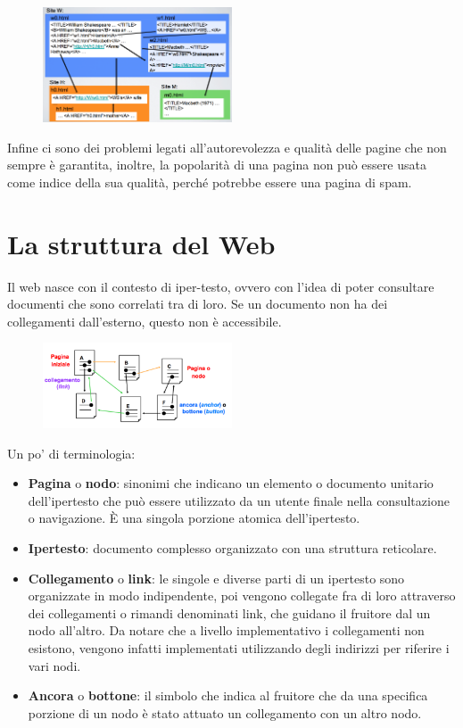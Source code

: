 \begin{figure}[htbp]
	\centering
	\includegraphics[width=0.5\textwidth]{images/l17-fig-1.png}
\end{figure}

Infine ci sono dei problemi legati all'autorevolezza e qualità delle pagine che non sempre è garantita, inoltre, la popolarità di una pagina non può essere usata come indice della sua qualità, perché potrebbe essere una pagina di spam.

\section{La struttura del Web}

Il web nasce con il contesto di iper-testo, ovvero con l'idea di poter consultare documenti che sono correlati tra di loro. Se un documento non ha dei collegamenti dall'esterno, questo non è accessibile.

\begin{figure}[htbp]
	\centering
	\includegraphics[width = 0.5\textwidth]{images/l17-fig-2}
\end{figure}

Un po' di terminologia:

\begin{itemize}
	\item \textbf{Pagina} o \textbf{nodo}: sinonimi che indicano un elemento o documento unitario dell'ipertesto che può essere utilizzato da un utente finale nella consultazione o navigazione. \`E una singola porzione atomica dell'ipertesto.
	\item \textbf{Ipertesto}: documento complesso organizzato con una struttura reticolare.
	\item \textbf{Collegamento} o \textbf{link}: le singole e diverse parti di un ipertesto sono organizzate in modo indipendente, poi vengono collegate fra di loro attraverso dei collegamenti o rimandi denominati link, che guidano il fruitore dal un nodo all'altro. Da notare che a livello implementativo i collegamenti non esistono, vengono infatti implementati utilizzando degli indirizzi per riferire i vari nodi.
	\item \textbf{Ancora} o \textbf{bottone}: il simbolo che indica al fruitore che da una specifica porzione di un nodo è stato attuato un collegamento con un altro nodo.
\end{itemize}

